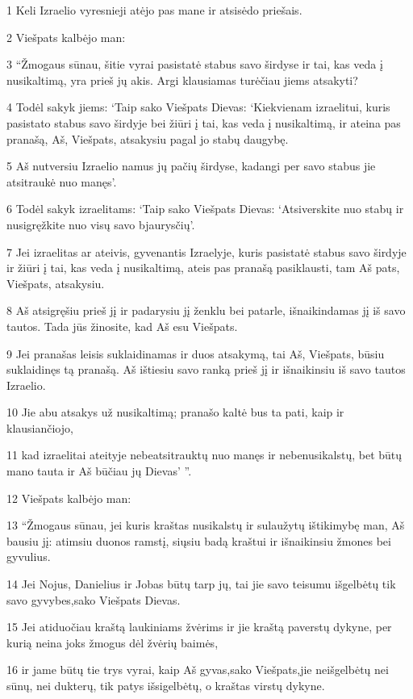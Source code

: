 \par 1 Keli Izraelio vyresnieji atėjo pas mane ir atsisėdo priešais. 
\par 2 Viešpats kalbėjo man: 
\par 3 “Žmogaus sūnau, šitie vyrai pasistatė stabus savo širdyse ir tai, kas veda į nusikaltimą, yra prieš jų akis. Argi klausiamas turėčiau jiems atsakyti? 
\par 4 Todėl sakyk jiems: ‘Taip sako Viešpats Dievas: ‘Kiekvienam izraelitui, kuris pasistato stabus savo širdyje bei žiūri į tai, kas veda į nusikaltimą, ir ateina pas pranašą, Aš, Viešpats, atsakysiu pagal jo stabų daugybę. 
\par 5 Aš nutversiu Izraelio namus jų pačių širdyse, kadangi per savo stabus jie atsitraukė nuo manęs’. 
\par 6 Todėl sakyk izraelitams: ‘Taip sako Viešpats Dievas: ‘Atsiverskite nuo stabų ir nusigręžkite nuo visų savo bjaurysčių’. 
\par 7 Jei izraelitas ar ateivis, gyvenantis Izraelyje, kuris pasistatė stabus savo širdyje ir žiūri į tai, kas veda į nusikaltimą, ateis pas pranašą pasiklausti, tam Aš pats, Viešpats, atsakysiu. 
\par 8 Aš atsigręšiu prieš jį ir padarysiu jį ženklu bei patarle, išnaikindamas jį iš savo tautos. Tada jūs žinosite, kad Aš esu Viešpats. 
\par 9 Jei pranašas leisis suklaidinamas ir duos atsakymą, tai Aš, Viešpats, būsiu suklaidinęs tą pranašą. Aš ištiesiu savo ranką prieš jį ir išnaikinsiu iš savo tautos Izraelio. 
\par 10 Jie abu atsakys už nusikaltimą; pranašo kaltė bus ta pati, kaip ir klausiančiojo, 
\par 11 kad izraelitai ateityje nebeatsitrauktų nuo manęs ir nebenusikalstų, bet būtų mano tauta ir Aš būčiau jų Dievas’ ”. 
\par 12 Viešpats kalbėjo man: 
\par 13 “Žmogaus sūnau, jei kuris kraštas nusikalstų ir sulaužytų ištikimybę man, Aš bausiu jį: atimsiu duonos ramstį, siųsiu badą kraštui ir išnaikinsiu žmones bei gyvulius. 
\par 14 Jei Nojus, Danielius ir Jobas būtų tarp jų, tai jie savo teisumu išgelbėtų tik savo gyvybes,­sako Viešpats Dievas.­ 
\par 15 Jei atiduočiau kraštą laukiniams žvėrims ir jie kraštą paverstų dykyne, per kurią neina joks žmogus dėl žvėrių baimės, 
\par 16 ir jame būtų tie trys vyrai, kaip Aš gyvas,­sako Viešpats,­jie neišgelbėtų nei sūnų, nei dukterų, tik patys išsigelbėtų, o kraštas virstų dykyne. 
